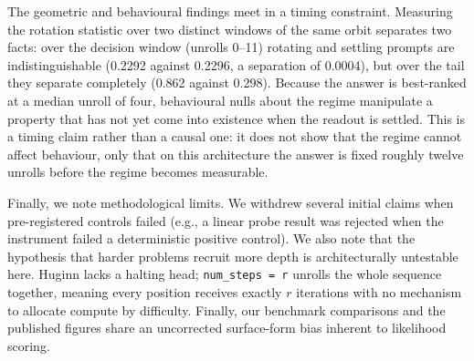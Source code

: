 The geometric and behavioural findings meet in a timing constraint. Measuring the rotation statistic over two distinct windows of the same orbit separates two facts: over the decision window (unrolls 0--11) rotating and settling prompts are indistinguishable (0.2292 against 0.2296, a separation of 0.0004), but over the tail they separate completely (0.862 against 0.298). Because the answer is best-ranked at a median unroll of four, behavioural nulls about the regime manipulate a property that has not yet come into existence when the readout is settled. This is a timing claim rather than a causal one: it does not show that the regime cannot affect behaviour, only that on this architecture the answer is fixed roughly twelve unrolls before the regime becomes measurable.


Finally, we note methodological limits. We withdrew several initial claims when pre-registered controls failed (e.g., a linear probe result was rejected when the instrument failed a deterministic positive control). We also note that the hypothesis that harder problems recruit more depth is architecturally untestable here. Huginn lacks a halting head; \texttt{num\_steps = r} unrolls the whole sequence together, meaning every position receives exactly $r$ iterations with no mechanism to allocate compute by difficulty. Finally, our benchmark comparisons and the published figures share an uncorrected surface-form bias inherent to likelihood scoring.
